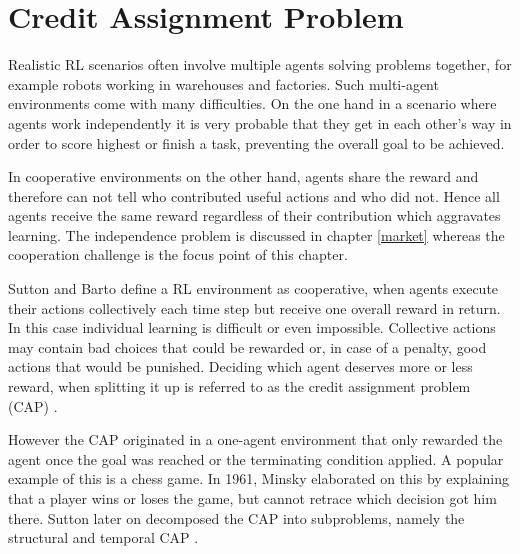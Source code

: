 \section{Credit Assignment Problem}
Realistic RL scenarios often involve multiple agents solving problems together, for example robots working in warehouses and factories. Such multi-agent environments come with many difficulties. On the one hand in a scenario where agents work independently it is very probable that they get in each other's way in order to score highest or finish a task, preventing the overall goal to be achieved.

In cooperative environments on the other hand, agents share the reward and therefore can not tell who contributed useful actions and who did not. Hence all agents receive the same reward regardless of their contribution which aggravates learning. The independence problem is discussed in chapter \ref{market} whereas the cooperation challenge is the focus point of this chapter.

Sutton and Barto \cite{suba18} define a RL environment as cooperative, when agents execute their actions collectively each time step but receive one overall reward in return. In this case individual learning is difficult or even impossible. Collective  actions may contain bad choices that could be rewarded or, in case of a penalty,  good actions that would be punished. Deciding which agent deserves more or less reward, when splitting it up is referred to as the credit assignment problem (CAP) \cite{mi61}.

However the CAP originated in a one-agent environment that only rewarded the agent once the goal was reached or the terminating condition applied. A popular example of this is a chess game. In 1961, Minsky \cite{mi61} elaborated on this by explaining that a player wins or loses the game, but cannot retrace which decision got him there. Sutton later on decomposed the CAP into subproblems, namely the structural and temporal CAP \cite{su84}.


